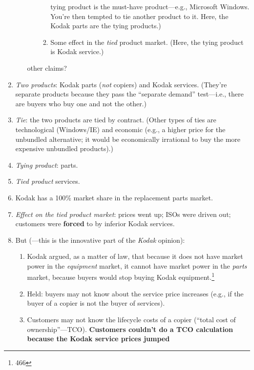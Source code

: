 \begin{enumerate}
\begin{enumerate}
\begin{enumerate}
\begin{enumerate}
                tying product is the must-have product---e.g., Microsoft 
                Windows. You're then tempted to tie another product to it.  
                Here, the Kodak parts are the tying products.)
                \item Some effect in the \emph{tied} product market. (Here, 
                the tying product is Kodak service.)
            \end{enumerate}
        \end{enumerate}
        \item [other claims?]
    \end{enumerate}
    \item \emph{Two products}: Kodak parts (\emph{not} copiers) and Kodak 
    services. (They're separate products because they pass the ``separate 
    demand'' test---i.e., there are buyers who buy one and not the 
    other.)
    \item \emph{Tie}: the two products are tied by contract. (Other types 
    of ties are technological (Windows/IE) and economic (e.g., a higher 
    price for the unbundled alternative; it would be economically 
    irrational to buy the more expensive unbundled products).)
    \item \emph{Tying product}: parts.
    \item \emph{Tied product} services.
    \item Kodak has a 100\% market share in the replacement parts market.
    \item \emph{Effect on the tied product market}: prices went up; ISOs 
    were driven out; customers were \textbf{forced} to by inferior Kodak 
    services.
    \item But (---this is the innovative part of the \emph{Kodak} opinion):
    \begin{enumerate}
        \item Kodak argued, as a matter of law, that because it does not 
        have market power in the \emph{equipment} market, it cannot have 
        market power in the \emph{parts} market, because buyers would stop 
        buying Kodak equipment.\footnote{466} 
        \item Held: buyers may not know about the service price increases 
        (e.g., if the buyer of a copier is not the buyer of services).
        \item Customers may not know the lifecycle costs of a copier 
        (``total cost of ownership''---TCO). \textbf{Customers couldn't do 
        a TCO calculation because the Kodak service prices jumped 
}
\end{enumerate}
\end{enumerate}

